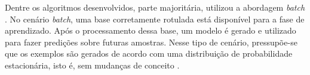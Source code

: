 \documentclass[qual, classic, a4paper]{ufbathesis}
\begin{document}

Dentre os algoritmos desenvolvidos, parte majoritária, utilizou a abordagem \textit{batch} \cite{Gama:2010:KDD:1855075}.
No cenário \textit{batch}, uma base corretamente rotulada está disponível para a fase de aprendizado.
Após o processamento dessa base, um modelo é gerado e utilizado para fazer predições sobre futuras amostras. 
Nesse tipo de cenário, pressupõe-se que os exemplos são gerados de acordo com uma distribuição de probabilidade estacionária, isto é, sem mudanças de conceito \cite{Gama:2010:KDD:1855075}.




\end{document}
